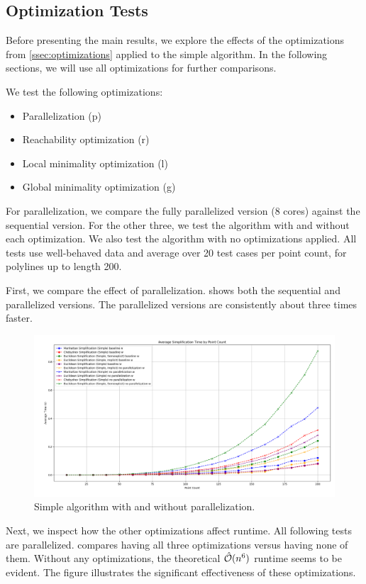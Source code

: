 \subsection{Optimization Tests}
Before presenting the main results, we explore the effects of the optimizations from \cref{ssec:optimizations} applied to the simple algorithm. In the following sections, we will use all optimizations for further comparisons.

We test the following optimizations:
\begin{itemize}
	\item Parallelization (p)
	\item Reachability optimization (r)
	\item Local minimality optimization (l)
	\item Global minimality optimization (g)
\end{itemize}

For parallelization, we compare the fully parallelized version (8 cores) against the sequential version. For the other three, we test the algorithm with and without each optimization. We also test the algorithm with no optimizations applied. All tests use well-behaved data and average over 20 test cases per point count, for polylines up to length 200.

First, we compare the effect of parallelization.  shows both the sequential and parallelized versions. The parallelized versions are consistently about three times faster.

\begin{figure}[b]
  \centering
	\includegraphics[scale=0.4]{./figures/simple-seq.png}
  \caption{Simple algorithm with and without parallelization.}
  \label{fig:simple-seq}
\end{figure}

Next, we inspect how the other optimizations affect runtime. All following tests are parallelized.  compares having all three optimizations versus having none of them. Without any optimizations, the theoretical \(\hat{\mathcal{O}}(n^6)\) runtime seems to be evident. The figure illustrates the significant effectiveness of these optimizations.

